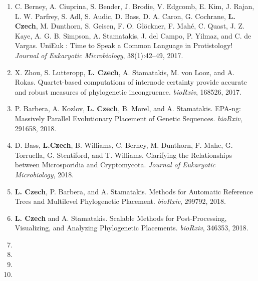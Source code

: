 \begin{enumerate}
    \item C. Berney, A. Ciuprina, S. Bender, J. Brodie, V. Edgcomb, E. Kim, J. Rajan, L. W. Parfrey, S. Adl, S. Audic,
        D. Bass, D. A. Caron, G. Cochrane, \textbf{L. Czech}, M. Dunthorn, S. Geisen, F. O. Glöckner, F. Mah{\'{e}}, C. Quast,
        J. Z. Kaye, A. G. B. Simpson, A. Stamatakis, J. del Campo, P. Yilmaz, and C. de Vargas.
        UniEuk : Time to Speak a Common Language in Protistology!
        \textit{Journal of Eukaryotic Microbiology}, 38(1):42--49, 2017. \cite{Berney2017}

    \item X. Zhou, S. Lutteropp, \textbf{L. Czech}, A. Stamatakis, M. von Looz, and A. Rokas.
        Quartet-based computations of internode certainty provide accurate and robust measures of phylogenetic incongruence.
        \textit{bioRxiv}, 168526, 2017. \cite{Zhou2017}

    \item P. Barbera, A. Kozlov, \textbf{L. Czech}, B. Morel, and A. Stamatakis.
        EPA-ng: Massively Parallel Evolutionary Placement of Genetic Sequences.
        \textit{bioRxiv}, 291658, 2018. \cite{Barbera2018}

    \item D. Bass, \textbf{L.Czech}, B. Williams, C. Berney, M. Dunthorn, F. Mahe, G. Torruella, G. Stentiford, and T. Williams.
        Clarifying the Relationships between Microsporidia and Cryptomycota.
        \textit{Journal of Eukaryotic Microbiology}, 2018.~\cite{Bass2018a}

    \item \textbf{L. Czech}, P. Barbera, and A. Stamatakis.
        Methods for Automatic Reference Trees and Multilevel Phylogenetic Placement.
        \textit{bioRxiv}, 299792, 2018. \cite{Czech2018}

    \item \textbf{L. Czech} and A. Stamatakis.
        Scalable Methods for Post-Processing, Visualizing, and Analyzing Phylogenetic Placements.
        \textit{bioRxiv}, 346353, 2018. \cite{Czech2018a}

    \item {}
    \item {}
    \item {}
    \item {}
\end{enumerate}

\clearpage
